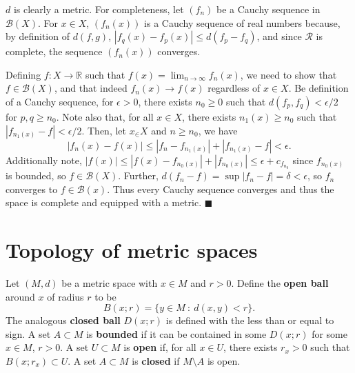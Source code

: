 \documentclass[letter-paper]{tufte-book}
\newenvironment{proof}[1][Proof]{\begin{trivlist}
\item[\hskip \labelsep {\bfseries #1}]}{\end{trivlist}}
\newcommand{\qed}{\hfill$\blacksquare$}
\begin{document}
\begin{proof}
  $d$ is clearly a metric. For completeness, let $(f_n)$ be a Cauchy sequence in
  $\mathcal{B}(X)$. For $x\in X$, $(f_n(x))$ is a Cauchy sequence of real
  numbers because, by definition of $d(f,g)$, $|f_q(x) - f_p(x)| \leq d(f_p -
  f_q)$, and since $\mathcal{R}$ is complete, the sequence $(f_n(x))$ converges.
  
  Defining $f: X\to\mathbb{R}$ such that $f(x) = \lim_{n\to\infty} f_n(x)$, we
  need to show that $f\in\mathcal{B}(X)$, and that indeed $f_n(x) \to f(x)$
  regardless of $x\in X$. Be definition of a Cauchy sequence, for $\epsilon >0$,
  there exists $n_0 \geq 0$ such that $d(f_p, f_q) < \epsilon / 2$ for $p, q
  \geq n_0$. Note also that, for all $x\in X$, there exists $n_1(x) \geq n_0$
  such that $|f_{n_1(x)} - f| < \epsilon / 2$. Then, let $x_\in X$ and $n \geq
  n_0$, we have
  \begin{equation*}
    |f_n(x) - f(x)| \leq |f_n - f_{n_1(x)}| + |f_{n_1(x)} - f| < \epsilon.
  \end{equation*}
  Additionally note, $|f(x)| \leq |f(x) - f_{n_0(x)}| + |f_{n_0(x)}| \leq
  \epsilon + c_{f_{n_0}}$ since $f_{n_0(x)}$ is bounded, so $f \in
  \mathcal{B}(X)$. Further, $d(f_n - f) = \sup |f_n - f| = \delta < \epsilon$,
  so $f_n$ converges to $f \in \mathcal{B}(x)$. Thus every Cauchy sequence
  converges and thus the space is complete and equipped with a metric. \qed
\end{proof}


\section{Topology of metric spaces}

Let $(M, d)$ be a metric space with $x \in M$ and $r > 0$. Define the
\textbf{open ball} around $x$ of radius $r$ to be
\begin{equation*}
  B(x; r) = \{ y \in M\ : \ d(x, y) < r\}.
\end{equation*}
The analogous \textbf{closed ball} $D(x; r)$ is defined with the less than or
equal to sign. A set $A \subset M$ is \textbf{bounded} if it can be contained in
some $D(x; r)$ for some $x \in M$, $r > 0$. A set $U \subset M$ is
\textbf{open} if, for all $x \in U$, there exists $r_{x} > 0$ such that
$B(x; r_{x}) \subset U$. A set $A \subset M$ is \textbf{closed} if $M
\setminus A$ is open.
\end{document}
